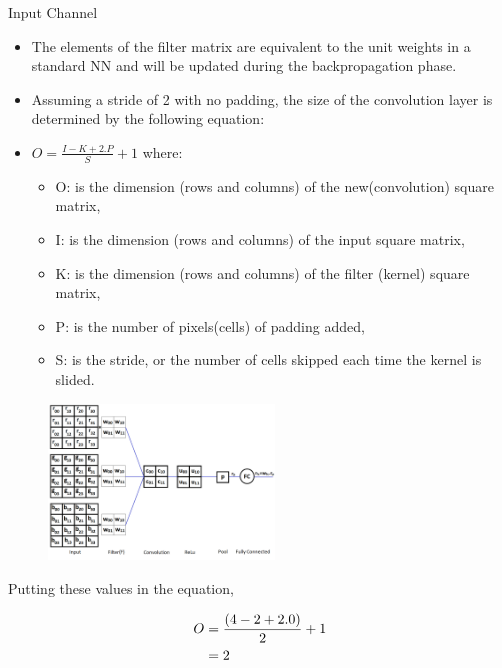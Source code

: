 \begin{vbframe}{Input Channel}
    \begin{itemize}
       \item The elements of the filter matrix are equivalent to the unit weights in a standard NN and will be updated during the backpropagation phase.
       \item Assuming a stride of 2 with no padding, the size of the convolution layer is determined by the following equation:
       \item $ O = \frac{I - K + 2.P}{S} + 1$ where: 
    \begin{itemize}
       \item O: is the dimension (rows and columns) of the new(convolution) square matrix, 
       \item I: is the dimension (rows and columns) of the input square matrix,
       \item K: is the dimension (rows and columns) of the filter (kernel) square matrix, 
       \item P: is the number of pixels(cells) of padding added,
       \item S: is the stride, or the number of cells skipped each time the kernel is slided.
    \end{itemize}
    \end{itemize}

 \begin{figure}
    \centering
    \includegraphics[width=6cm]{plots/05_conv_variations/channels/cnn-net.png}
  \end{figure}

Putting these values in the equation,

\begin{align} 
O&={(4 - 2 + 2.0)\over 2} + 1\\ 
&=2 
\end{align}

\end{vbframe}




